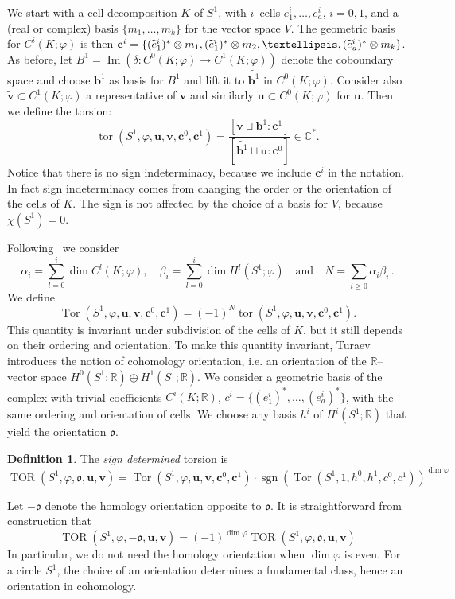 \documentclass[11pt]{article}
\theoremstyle{definition}
\newtheorem{defi}[theo]{Definition}
\numberwithin{equation}{section}
\numberwithin{figure}{section}
\numberwithin{table}{section}
\DeclareMathOperator{\tor}{tor}
\DeclareMathOperator{\TOR}{TOR}
\DeclareMathOperator{\Tor}{Tor}
\DeclareMathOperator{\Imop}{Im}
\DeclareMathOperator{\sgn}{sgn}
\newcommand{\Cbb}{\mathbb{C}}
\newcommand{\Rbb}{\mathbb {R}}
\newcommand{\ofrk}{\mathfrak{o}}
\newcommand{\ubf}{\mathbf{u}}
\newcommand{\vbf}{\mathbf{v}}
\newcommand{\cbf}{\mathbf{c}}
\newcommand{\bbf}{\mathbf{b}}
\let\oldtilde\tilde
\renewcommand*{\tilde}[1]{\mathchoice{\widetilde{#1}}{\widetilde{#1}}{\oldtilde{#1}}{\oldtilde{#1}}}\let\oldhat\hat
\renewcommand*{\hat}[1]{\mathchoice{\widehat{#1}}{\widehat{#1}}{\oldhat{#1}}{\oldhat{#1}}}\let\oldforall\forall
\renewcommand*{\forall}{\mathrel{\oldforall}}
\begin{document}
We start with a cell decomposition $K$ of $S^1$, with $i$--cells $e^i_1,\dots, e^i_a$, $i=0,1$, and a (real or complex) basis $\{m_1,\dots,m_k\}$ for the vector space $V$. The geometric basis for $C^i(K;\varphi)$ is then $\cbf^i=\{(\tilde e^i_1)^*\otimes m_1,(\tilde e^i_1)^*\otimes m_2,\dots, (\tilde e^i_a)^*\otimes m_k \}$. As before, let $B^1=\Imop (\delta\colon C^0(K;\varphi)\to C^1(K;\varphi))$ denote the coboundary space and choose $\bbf^1$ as basis for $B^1$ and lift it to $\widetilde{\bbf^1}$ in $ C^0(K;\varphi) $. Consider also $\widetilde{\vbf}\subset C^1(K;\varphi) $ a representative of $\vbf$ and similarly $\widetilde{\ubf}\subset C^0(K;\varphi) $ for $\ubf$. Then we define the torsion:
\[
\tor(S^1, \varphi, \ubf,\vbf,\cbf^0,\cbf^1)=
\frac{[\widetilde {\vbf}\sqcup\bbf^1 : \cbf^1]} {[\widetilde{\bbf^1}\sqcup \widetilde {\ubf} : \cbf^0]}
\in \Cbb^*.
\]
Notice that there is no sign indeterminacy, because we include $ \cbf^i $ in the notation. In fact sign indeterminacy comes from changing the order or the orientation of the cells of $K$. The sign is not affected by the choice of a basis for $V$, because $\chi(S^1)=0$.

Following~\cite[Section~3]{TuraevKnotTheory} we consider
\[
\alpha_i=\sum_{l=0}^i\dim C^l(K;\varphi), \quad \beta_i= \sum_{l=0}^i\dim H^l(S^1;\varphi) \quad\text{and}\quad N=\sum_{i\geq 0}\alpha_i\beta_i\,.
\]
We define
\[
\Tor(S^1, \varphi, \ubf,\vbf,\cbf^0,\cbf^1)= (-1)^N\tor(S^1, \varphi, \ubf,\vbf,\cbf^0,\cbf^1).
\]
This quantity is invariant under subdivision of the cells of $K$, but it still depends on their ordering and orientation. To make this quantity invariant, Turaev introduces the notion of cohomology orientation, i.e. an orientation of the $\Rbb$--vector space $H^0(S^1;\Rbb)\oplus H^1(S^1;\Rbb)$. We consider a geometric basis of the complex with trivial coefficients $C^i(K; \Rbb)$, ${c}^i=\{(e^i_1)^*,\dots, (e^i_a)^*\}$, with the same ordering and orientation of cells. We choose any basis $h^i$ of $H^i(S^1;\Rbb)$ that yield the orientation $\ofrk$.

\begin{defi}
The \emph{sign determined} torsion is
\[
\TOR(S^1,\varphi,\ofrk,\ubf,\vbf)=
\Tor(S^1, \varphi, \ubf,\vbf,\cbf^0,\cbf^1)\cdot
\sgn \left(\Tor(S^1, 1, h^0,h^1,{c}^0,{c}^1)\right)^{\dim\varphi}
\]
\end{defi}

Let $-\ofrk$ denote the homology orientation opposite to $\ofrk$. It is straightforward from construction that
\begin{equation}\label{eq:change_or}
\TOR(S^1,\varphi,-\ofrk,\ubf,\vbf)= (-1)^{\dim\varphi}\TOR(S^1,\varphi,\ofrk,\ubf,\vbf)
\end{equation}
In particular, we do not need the homology orientation when $\dim\varphi$ is even. For a circle $S^1$, the choice of an orientation determines a fundamental class, hence an orientation in cohomology.
\end{document}
